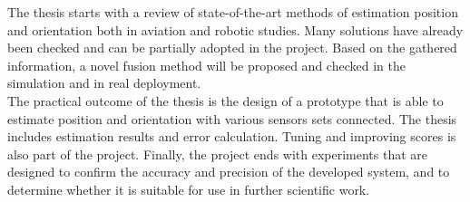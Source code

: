The thesis starts with a review of state-of-the-art methods of estimation position and orientation both in aviation and robotic studies. Many solutions have already been checked and can be partially adopted in the project. Based on the gathered information, a novel fusion method will be proposed and checked in the simulation and in real deployment.\\

The practical outcome of the thesis is the design of a prototype that is able to estimate position and orientation with various sensors sets connected. The thesis includes estimation results and error calculation. Tuning and improving scores is also part of the project. Finally, the project ends with experiments that are designed to confirm the accuracy and precision of the developed system, and to determine whether it is suitable for use in further scientific work. 